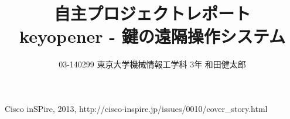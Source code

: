 \documentclass[a4paper,10pt,twocolumn]{jarticle}
\title{自主プロジェクトレポート \\ keyopener - 鍵の遠隔操作システム}
\author{03-140299 東京大学機械情報工学科 3年 和田健太郎}
\begin{document}
\maketitle


















\begin{thebibliography}{9}
   Cisco inSPire, 2013, http://cisco-inspire.jp/issues/0010/cover\_story.html
\end{thebibliography}
\end{document}
